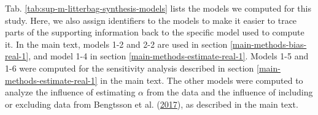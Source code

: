 \documentclass[
  12pt,
]{article}
\begin{document}
Tab. \ref{tab:sup-m-litterbag-synthesis-models} lists the models we computed for this study. Here, we also assign identifiers to the models to make it easier to trace parts of the supporting information back to the specific model used to compute it. In the main text, models 1-2 and 2-2 are used in section \ref{main-methods-bias-real-1}, and model 1-4 in section \ref{main-methods-estimate-real-1}. Models 1-5 and 1-6 were computed for the sensitivity analysis described in section \ref{main-methods-estimate-real-1} in the main text. The other models were computed to analyze the influence of estimating \(\alpha\) from the data and the influence of including or excluding data from Bengtsson et al. (\protect\hyperlink{ref-Bengtsson.2017}{2017}), as described in the main text.
\end{document}
